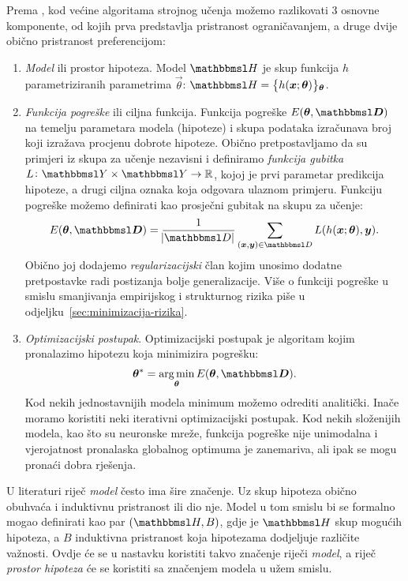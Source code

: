 \documentclass[utf8, diplomski, lmodern]{fer}
\begin{document}
Prema \citet{Snajder:2014:SU}, kod većine algoritama strojnog učenja možemo razlikovati 3 osnovne komponente, od kojih prva predstavlja pristranost ograničavanjem, a druge dvije obično pristranost preferencijom:
\begin{enumerate}
	\item \emph{Model} ili prostor hipoteza. Model $\set H$ je skup funkcija $h$  parametriziranih parametrima $\vec\theta$: $\set H=\cbr{h(\vec x;\vec{\theta})}_{\vec{\theta}}$.
	\item \emph{Funkcija pogreške} ili ciljna funkcija. Funkcija pogreške $E(\vec{\theta,\set D})$ na temelju parametara modela (hipoteze) i skupa podataka izračunava broj koji izražava procjenu dobrote hipoteze. Obično pretpostavljamo da su primjeri iz skupa za učenje nezavisni i definiramo \emph{funkcija gubitka} $\funcdef{L}{\set Y\times\set Y}{\R}$, kojoj je prvi parametar predikcija hipoteze, a drugi ciljna oznaka koja odgovara ulaznom primjeru. Funkciju pogreške možemo definirati kao prosječni gubitak na skupu za učenje:
	\begin{align}
	E(\vec{\theta,\set D})=\frac{1}{\envert{\set D}}\sum_{(\vec x,\vec y)\in\set D} L(h(\vec x;\vec{\theta}),\vec y) \text{.}
	\end{align}
	Obično joj dodajemo \emph{regularizacijski} član kojim unosimo dodatne pretpostavke radi postizanja bolje generalizacije. Više o funkciji pogreške u smislu smanjivanja empirijskog i strukturnog rizika piše u odjeljku~\ref{sec:minimizacija-rizika}.
	\item \emph{Optimizacijski postupak}. Optimizacijski postupak je algoritam kojim pronalazimo hipotezu koja minimizira pogrešku:
	\begin{align}
	\vec\theta^* = \argmin_{\vec{\theta}} E(\vec{\theta,\set D}) \text{.}
	\end{align}
	Kod nekih jednostavnijih modela minimum možemo odrediti analitički. Inače moramo koristiti neki iterativni optimizacijski postupak. Kod nekih složenijih modela, kao što su neuronske mreže, funkcija pogreške nije unimodalna i vjerojatnost pronalaska globalnog optimuma je zanemariva, ali ipak se mogu pronaći dobra rješenja.
\end{enumerate}

U literaturi riječ \textit{model} često ima šire značenje. Uz skup hipoteza obično obuhvaća i induktivnu pristranost ili dio nje. Model u tom smislu bi se formalno mogao definirati kao par $(\set H, B)$, gdje je $\set H$ skup mogućih hipoteza, a $B$ induktivna pristranost koja hipotezama dodjeljuje različite važnosti. Ovdje će se u nastavku koristiti takvo značenje riječi \textit{model}, a riječ \textit{prostor hipoteza} će se koristiti sa značenjem modela u užem smislu.
\end{document}

